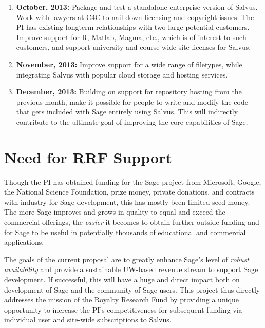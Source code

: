 \documentclass[11pt]{article}
\begin{document}
\begin{enumerate}
\item {\bf October, 2013:} Package and test a standalone enterprise
  version of Salvus.  Work with lawyers at C4C to nail down licensing
  and copyright issues. The PI has existing longterm relationships
  with two large potential customers.  Improve support
  for R, Matlab, Magma, etc., which is of interest to such customers,
  and support university and course wide site licenses for Salvus.

\item {\bf November, 2013:} Improve support for a wide range of
  filetypes, while integrating Salvus with popular cloud storage and
  hosting services.
\item {\bf December, 2013:} Building on support for repository hosting
  from the previous month, make it possible for people to write and
  modify the code that gets included with Sage entirely using Salvus.
  This will indirectly contribute to the ultimate goal of improving
  the core capabilities of Sage.
\end{enumerate}


\section{Need for RRF Support}

Though the PI has obtained funding for the Sage project from
Microsoft, Google, the National Science Foundation, prize money,
private donations, and contracts with industry for Sage development,
this has mostly been limited seed money.  The more Sage improves and
grows in quality to equal and exceed the commercial offerings, the
{\em easier} it becomes to obtain further outside funding and for Sage
to be useful in potentially thousands of educational and commercial
applications.

The goals of the current proposal are to greatly enhance Sage's level
of {\em robust availability} and provide a sustainable UW-based
revenue stream to support Sage development.  If successful, this will
have a huge and direct impact both on development of Sage and the
community of Sage users.  This project thus directly addresses the
mission of the Royalty Research Fund by providing a unique opportunity
to increase the PI's competitiveness for subsequent funding via
individual user and site-wide subscriptions to Salvus.
\end{document}

